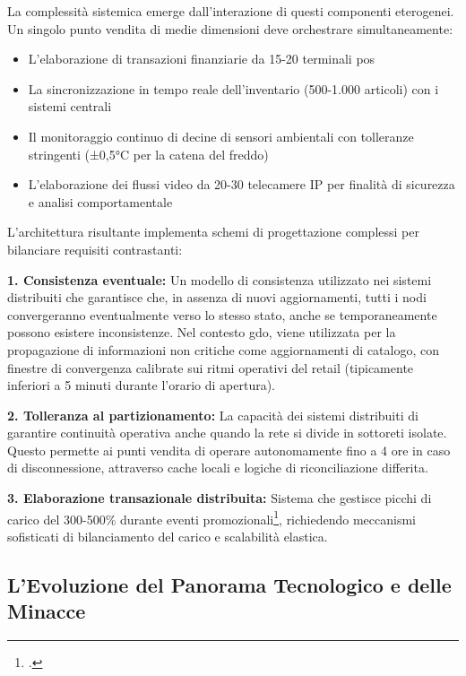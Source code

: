 La complessità sistemica emerge dall'interazione di questi componenti eterogenei. Un singolo punto vendita di medie dimensioni deve orchestrare simultaneamente:
\begin{itemize}
\item L'elaborazione di transazioni finanziarie da 15-20 terminali \gls{pos}
\item La sincronizzazione in tempo reale dell'inventario (500-1.000 articoli) con i sistemi centrali
\item Il monitoraggio continuo di decine di sensori ambientali con tolleranze stringenti (±0,5°C per la catena del freddo)
\item L'elaborazione dei flussi video da 20-30 telecamere IP per finalità di sicurezza e analisi comportamentale
\end{itemize}

L'architettura risultante implementa schemi di progettazione complessi per bilanciare requisiti contrastanti:

\textbf{1. Consistenza eventuale:} Un modello di consistenza utilizzato nei sistemi distribuiti che garantisce che, in assenza di nuovi aggiornamenti, tutti i nodi convergeranno eventualmente verso lo stesso stato, anche se temporaneamente possono esistere inconsistenze. Nel contesto \gls{gdo}, viene utilizzata per la propagazione di informazioni non critiche come aggiornamenti di catalogo, con finestre di convergenza calibrate sui ritmi operativi del retail (tipicamente inferiori a 5 minuti durante l'orario di apertura).

\textbf{2. Tolleranza al partizionamento:} La capacità dei sistemi distribuiti di garantire continuità operativa anche quando la rete si divide in sottoreti isolate. Questo permette ai punti vendita di operare autonomamente fino a 4 ore in caso di disconnessione, attraverso cache locali e logiche di riconciliazione differita.

\textbf{3. Elaborazione transazionale distribuita:} Sistema che gestisce picchi di carico del 300-500\% durante eventi promozionali\footcite{Osservatorio2024}, richiedendo meccanismi sofisticati di bilanciamento del carico e scalabilità elastica.

\subsection{\texorpdfstring{L'Evoluzione del Panorama Tecnologico e delle Minacce}{1.1.2 - L'Evoluzione del Panorama Tecnologico e delle Minacce}}
\label{subsec:evoluzione_tecnologica}


